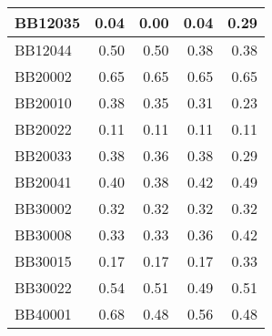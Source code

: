 \begin{table}[!htbp]
\begin{tabular}{|l|r|r|r|r|}
		BB12035 & \cellcolor[rgb]{ .467,  .78,  .549}0.04 & \cellcolor[rgb]{ .384,  .745,  .478}0.00 & \cellcolor[rgb]{ .467,  .78,  .549}0.04 & \cellcolor[rgb]{ .988,  1,  .992}0.29 \\
		\hline
		BB12044 & \cellcolor[rgb]{ .988,  1,  .992}0.50 & \cellcolor[rgb]{ .988,  1,  .992}0.50 & \cellcolor[rgb]{ .384,  .745,  .478}0.38 & \cellcolor[rgb]{ .384,  .745,  .478}0.38 \\
		\hline
		BB20002 & \cellcolor[rgb]{ .988,  1,  .992}0.65 & \cellcolor[rgb]{ .988,  1,  .992}0.65 & \cellcolor[rgb]{ .988,  1,  .992}0.65 & \cellcolor[rgb]{ .988,  1,  .992}0.65 \\
		\hline
		BB20010 & \cellcolor[rgb]{ .988,  1,  .992}0.38 & \cellcolor[rgb]{ .835,  .933,  .863}0.35 & \cellcolor[rgb]{ .686,  .871,  .733}0.31 & \cellcolor[rgb]{ .384,  .745,  .478}0.23 \\
		\hline
		BB20022 & \cellcolor[rgb]{ .988,  1,  .992}0.11 & \cellcolor[rgb]{ .988,  1,  .992}0.11 & \cellcolor[rgb]{ .988,  1,  .992}0.11 & \cellcolor[rgb]{ .988,  1,  .992}0.11 \\
		\hline
		BB20033 & \cellcolor[rgb]{ .988,  1,  .992}0.38 & \cellcolor[rgb]{ .835,  .933,  .863}0.36 & \cellcolor[rgb]{ .988,  1,  .992}0.38 & \cellcolor[rgb]{ .384,  .745,  .478}0.29 \\
		\hline
		BB20041 & \cellcolor[rgb]{ .502,  .792,  .58}0.40 & \cellcolor[rgb]{ .384,  .745,  .478}0.38 & \cellcolor[rgb]{ .624,  .843,  .682}0.42 & \cellcolor[rgb]{ .988,  1,  .992}0.49 \\
		\hline
		BB30002 & \cellcolor[rgb]{ .988,  1,  .992}0.32 & \cellcolor[rgb]{ .988,  1,  .992}0.32 & \cellcolor[rgb]{ .988,  1,  .992}0.32 & \cellcolor[rgb]{ .988,  1,  .992}0.32 \\
		\hline
		BB30008 & \cellcolor[rgb]{ .384,  .745,  .478}0.33 & \cellcolor[rgb]{ .384,  .745,  .478}0.33 & \cellcolor[rgb]{ .584,  .827,  .647}0.36 & \cellcolor[rgb]{ .988,  1,  .992}0.42 \\
		\hline
		BB30015 & \cellcolor[rgb]{ .384,  .745,  .478}0.17 & \cellcolor[rgb]{ .384,  .745,  .478}0.17 & \cellcolor[rgb]{ .384,  .745,  .478}0.17 & \cellcolor[rgb]{ .988,  1,  .992}0.33 \\
		\hline
		BB30022 & \cellcolor[rgb]{ .988,  1,  .992}0.54 & \cellcolor[rgb]{ .584,  .827,  .647}0.51 & \cellcolor[rgb]{ .384,  .745,  .478}0.49 & \cellcolor[rgb]{ .584,  .827,  .647}0.51 \\
		\hline
		BB40001 & \cellcolor[rgb]{ .988,  1,  .992}0.68 & \cellcolor[rgb]{ .384,  .745,  .478}0.48 & \cellcolor[rgb]{ .624,  .847,  .682}0.56 & \cellcolor[rgb]{ .384,  .745,  .478}0.48 \\

\end{tabular}
\end{table}
